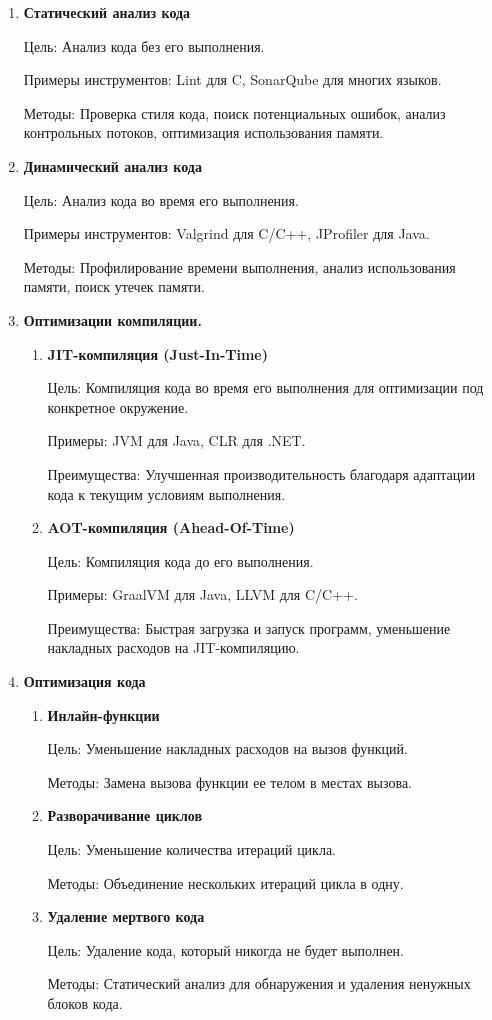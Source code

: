 \documentclass{mipt-thesis-bs}
\begin{document}
\begin{enumerate}
\item \textbf{Статический анализ кода}

Цель: Анализ кода без его выполнения.

Примеры инструментов: Lint для C, SonarQube для многих языков.

Методы: Проверка стиля кода, поиск потенциальных ошибок, анализ контрольных потоков, оптимизация использования памяти.

\item \textbf{Динамический анализ кода}

Цель: Анализ кода во время его выполнения.

Примеры инструментов: Valgrind для C/C++, JProfiler для Java.

Методы: Профилирование времени выполнения, анализ использования памяти, поиск утечек памяти.

\item \textbf{Оптимизации компиляции.}
    \begin{enumerate}
        \item \textbf{JIT-компиляция (Just-In-Time)}

        Цель: Компиляция кода во время его выполнения для оптимизации под конкретное окружение.

        Примеры: JVM для Java, CLR для .NET.

        Преимущества: Улучшенная производительность благодаря адаптации кода к текущим условиям выполнения.

        \item \textbf{AOT-компиляция (Ahead-Of-Time)}

        Цель: Компиляция кода до его выполнения.

        Примеры: GraalVM для Java, LLVM для C/C++.

        Преимущества: Быстрая загрузка и запуск программ, уменьшение накладных расходов на JIT-компиляцию.
    \end{enumerate}

\item \textbf{Оптимизация кода}
    \begin{enumerate}
        \item \textbf{Инлайн-функции}

        Цель: Уменьшение накладных расходов на вызов функций.

        Методы: Замена вызова функции ее телом в местах вызова.

        \item \textbf{Разворачивание циклов}

        Цель: Уменьшение количества итераций цикла.

        Методы: Объединение нескольких итераций цикла в одну.

        \item \textbf{Удаление мертвого кода}

        Цель: Удаление кода, который никогда не будет выполнен.

        Методы: Статический анализ для обнаружения и удаления ненужных блоков кода.
    \end{enumerate}
\end{enumerate}
\end{document}
